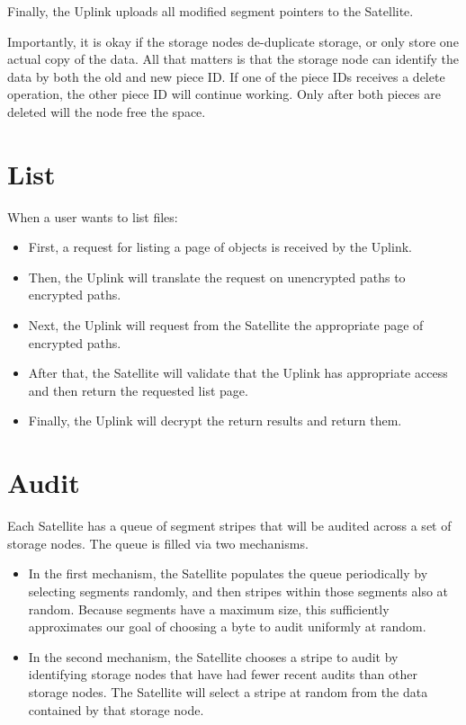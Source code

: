 \documentclass[8pt,fleqn,openany]{book}
\begin{document}
Finally, the Uplink uploads all modified segment pointers to the Satellite.

Importantly, it is okay if the storage nodes de-duplicate storage, or only
store one actual copy of the data. All that matters is that the storage node
can identify the data by both the old and new piece ID. If one of the piece
IDs receives a delete operation, the other piece ID will continue working.
Only after both pieces are deleted will the node free the space.

\section{List}

When a user wants to list files:

\begin{itemize}
\item First, a request for listing a page of objects is received by the Uplink.
\item Then, the Uplink will translate the request on unencrypted paths to encrypted
  paths.
\item Next, the Uplink will request from the Satellite the appropriate page of
  encrypted paths.
\item After that, the Satellite will validate that the Uplink has appropriate access
  and then return the requested list page.
\item Finally, the Uplink will decrypt the return results and return them.
\end{itemize}

\section{Audit}

Each Satellite has a queue of segment stripes that will be audited across
  a set of storage nodes. The queue is filled via two mechanisms.
  \begin{itemize}
  \item In the first mechanism, the Satellite populates the queue periodically
    by selecting segments randomly, and then stripes within those segments also
    at random. Because segments have a maximum size, this sufficiently
    approximates our goal of choosing a byte to audit uniformly at random.
  \item In the second mechanism, the Satellite chooses a stripe to audit by
    identifying storage nodes that have had fewer recent audits than other
    storage nodes. The Satellite will select a stripe at random from the data
    contained by that storage node.
  \end{itemize}
\end{document}
